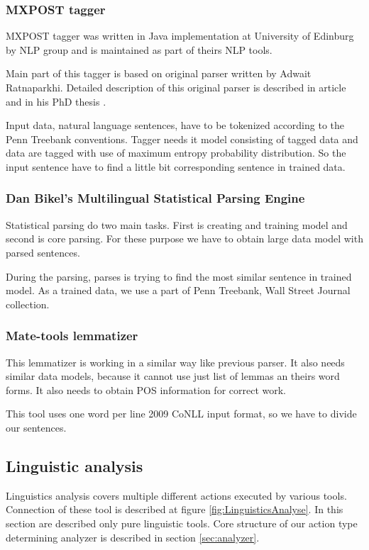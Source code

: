 \subsubsection{MXPOST tagger} 
MXPOST tagger was written in Java implementation at University of Edinburg by NLP group and is maintained as part of theirs NLP tools.
        
Main part of this tagger is based on original parser written by Adwait Ratnaparkhi. Detailed description of this original parser is described in article \cite{Linguistics-ratnaparkhi96} and in his PhD thesis \cite{Linguistics-ratnaparkhi98}. 

Input data, natural language sentences, have to be tokenized according to the Penn Treebank conventions. Tagger needs it model consisting of tagged data and data are tagged with use of maximum entropy probability distribution. So the input sentence have to find a little bit corresponding sentence in trained data.
  
\subsubsection{Dan Bikel's Multilingual Statistical Parsing Engine}   

Statistical parsing do two main tasks. First is creating and training model and second is core parsing. For these purpose we have to obtain large data model with parsed sentences. 

During the parsing, parses is trying to find the most similar sentence in trained model. As a trained data, we use a part of Penn Treebank, Wall Street Journal collection.

\subsubsection{Mate-tools lemmatizer}          
          
This lemmatizer is working in a similar way like previous parser. It also needs similar data models, because it cannot use just list of lemmas an theirs word forms. It also needs to obtain POS information for correct work.

This tool uses one word per line 2009 CoNLL  input format, so we have to divide our sentences.

\subsection{Linguistic analysis}
\label{sec:analysis}
Linguistics analysis covers multiple different actions executed by various tools. Connection of these tool is described at figure \ref{fig:LinguisticsAnalyse}. In this section are described only pure linguistic tools. Core structure of our action type determining analyzer is described in section \ref{sec:analyzer}.

